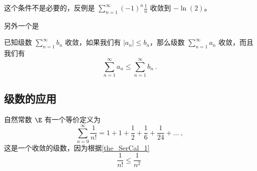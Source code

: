 这个条件不是必要的，反例是 $\sum_{n = 1}^\infty (-1)^n\frac1{n}$ 收敛到 $-\ln(2)$。

另外一个是
\begin{theorem}{}\label{the_SerCal_1}
已知级数 $\sum_{n=1}^\infty b_n$ 收敛，如果我们有 $|a_n| \leq b_n$，那么级数 $\sum_{n=1}^\infty a_n$ 收敛，而且我们有
$$
\sum_{n=1}^\infty a_n \leq \sum_{n=1}^\infty b_n ~.
$$
\end{theorem}




\subsection{级数的应用}



自然常数 $\E$ 有一个等价定义为
\begin{equation}
\sum_{n=0}^\infty \frac{1}{n!} = 1 + 1 + \frac{1}{2} + \frac{1}{6} + \frac{1}{24} + \dots~,
\end{equation}
这是一个收敛的级数，因为根据\autoref{the_SerCal_1} 
$$
\frac1{n!} \leq \frac1{n^2}~
$$
